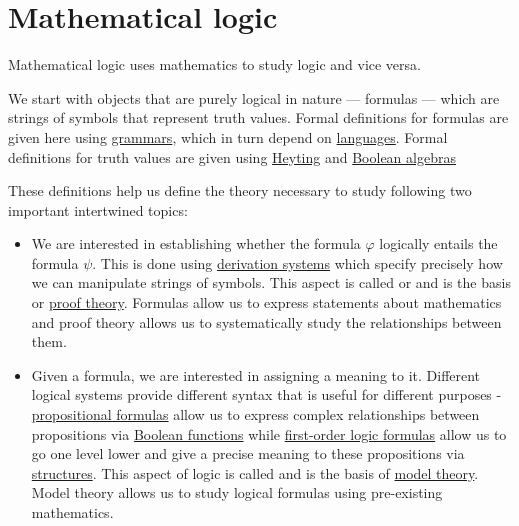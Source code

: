 \section{Mathematical logic}\label{sec:mathematical_logic}

Mathematical logic uses mathematics to study logic and vice versa.

We start with objects that are purely logical in nature --- formulas --- which are strings of symbols that represent truth values. Formal definitions for formulas are given here using \hyperref[def:grammar]{grammars}, which in turn depend on \hyperref[def:language]{languages}. Formal definitions for truth values are given using \hyperref[def:heyting_algebra]{Heyting} and \hyperref[def:boolean_algebra]{Boolean algebras}

These definitions help us define the theory necessary to study following two important intertwined topics:
\begin{itemize}
  \item We are interested in establishing whether the formula \( \varphi \) logically entails the formula \( \psi \). This is done using \hyperref[def:proof_derivation_system]{derivation systems} which specify precisely how we can manipulate strings of symbols. This aspect is called  or  and is the basis or \hyperref[def:derivation_system_derivability]{proof theory}. Formulas allow us to express statements about mathematics and proof theory allows us to systematically study the relationships between them.

  \item Given a formula, we are interested in assigning a meaning to it. Different logical systems provide different syntax that is useful for different purposes - \hyperref[def:propositional_syntax/formula]{propositional formulas} allow us to express complex relationships between propositions via \hyperref[subsec:boolean_functions]{Boolean functions} while \hyperref[def:first_order_syntax/formula]{first-order logic formulas} allow us to go one level lower and give a precise meaning to these propositions via \hyperref[def:first_order_structure]{structures}. This aspect of logic is called  and is the basis of \hyperref[subsec:first_order_models]{model theory}. Model theory allows us to study logical formulas using pre-existing mathematics.
\end{itemize}

